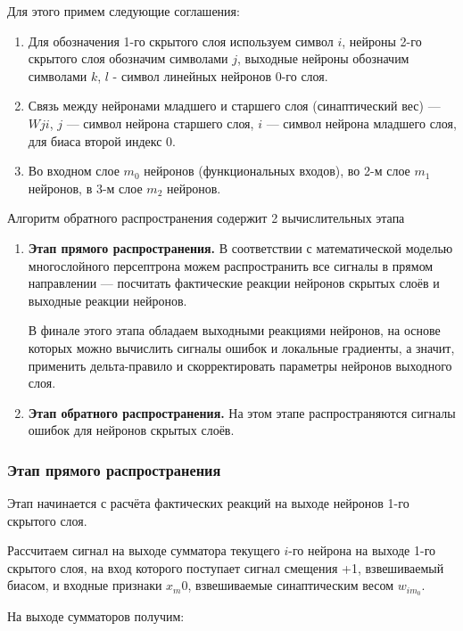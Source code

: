 \documentclass{article}
\numberwithin{equation}{subsection}
\begin{document}
Для этого примем следующие соглашения:
\begin{enumerate}
    \item Для обозначения 1-го скрытого слоя используем символ $i$, нейроны 2-го скрытого слоя 
    обозначим символами $j$, выходные нейроны обозначим символами $k$, $l$ - символ линейных 
    нейронов 0-го слоя.
    \item Связь между нейронами младшего и старшего слоя (синаптический вес) --- $W{ji}$, 
    $j$ --- символ нейрона старшего слоя, $i$ --- символ нейрона младшего слоя, 
    для биаса второй индекс $0$.
    \item Во входном слое $m_0$ нейронов (функциональных входов), во 2-м слое 
    $m_1$ нейронов, в 3-м слое $m_2$ нейронов.
\end{enumerate}

Алгоритм обратного распространения содержит 2 вычислительных этапа
\begin{enumerate}
    \item \textbf{Этап прямого распространения.} В соответствии с математической моделью многослойного 
    персептрона можем распространить все сигналы в прямом направлении --- посчитать фактические 
    реакции нейронов скрытых слоёв и выходные реакции нейронов. 
    
    В финале этого этапа обладаем выходными реакциями нейронов, на основе которых можно 
    вычислить сигналы ошибок и локальные градиенты, а значит, применить дельта-правило 
    и скорректировать параметры нейронов выходного слоя.
    \item \textbf{Этап обратного распространения.} 
    На этом этапе распространяются сигналы ошибок для нейронов скрытых слоёв.
\end{enumerate}



\subsubsection{Этап прямого распространения}

Этап начинается с расчёта фактических реакций на выходе нейронов 1-го скрытого слоя. 

Рассчитаем сигнал на выходе сумматора текущего $i$-го нейрона на выходе 1-го скрытого слоя, 
на вход которого  поступает сигнал смещения \glqq +1\grqq, взвешиваемый биасом, и входные признаки 
$x_m0$, взвешиваемые синаптическим весом $w_{im_0}$.

На выходе сумматоров получим:
\end{document}
